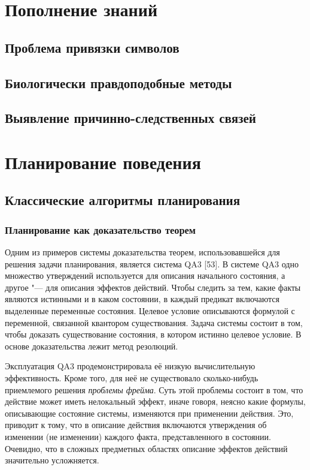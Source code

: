 \documentclass[b5paper,11pt]{book}
\numberwithin{Def}{section}
\numberwithin{Th}{chapter}
\numberwithin{St}{chapter}
\begin{document}
	\chapter{Пополнение знаний}
	
	\section{Проблема привязки символов}
	\section{Биологически правдоподобные методы}
	\section{Выявление причинно-следственных связей}
	
	
	
	\chapter{Планирование поведения}
	
	\section{Классические алгоритмы планирования}
	\subsection{Планирование как доказательство теорем}
	
	Одним из примеров системы доказательства теорем, использовавшейся для решения задачи планирования, является система QA3 [53]. В системе QA3 одно множество утверждений используется для описания начального состояния, а другое "--- для описания эффектов действий. Чтобы следить за тем, какие факты являются истинными и в каком состоянии, в каждый предикат включаются выделенные переменные состояния. Целевое условие описываются формулой с переменной, связанной квантором существования. Задача системы состоит в том, чтобы доказать существование состояния, в котором истинно целевое условие. В основе доказательства лежит метод резолюций.

	Эксплуатация QA3 продемонстрировала её низкую вычислительную эффективность.	Кроме того, для неё не существовало сколько-нибудь приемлемого решения \textit{проблемы фрейма}. Суть этой проблемы состоит в том, что действие может иметь нелокальный эффект, иначе говоря, неясно какие формулы, описывающие состояние системы, изменяются при применении действия. Это, приводит к тому, что в описание действия включаются утверждения об изменении (не изменении) каждого факта, представленного в состоянии. Очевидно, что в сложных предметных областях описание эффектов действий значительно усложняется. 
	
\end{document}
